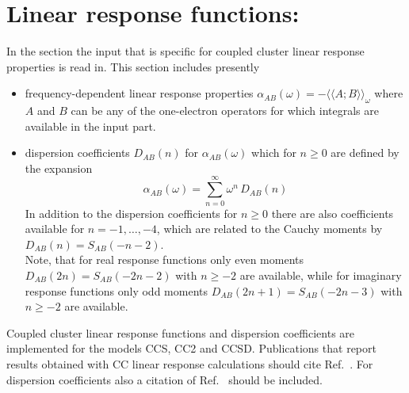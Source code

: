 
\section{Linear response functions: }\label{sec:cclr}

In the  section the input that is
specific for coupled cluster linear response properties is read in. 
This section includes presently 
\begin{itemize}
\item frequency-dependent linear response properties 
      $\alpha_{AB}(\omega)  = - \langle\langle A; B \rangle\rangle_\omega$
      where $A$ and $B$ can be any of the one-electron
      operators for which integrals are available in the 
       input part.
\item dispersion coefficients $D_{AB}(n)$ for $\alpha_{AB}(\omega)$
      which for $n \ge 0$ are defined by the expansion
      $$ \alpha_{AB}(\omega) = \sum_{n=0}^{\infty} \omega^n \, D_{AB}(n) $$
      In addition to the dispersion coefficients for $n \ge 0$
      there are also coefficients available for $ n = -1, \ldots, -4$,
      which are related to the Cauchy moments
       by $ D_{AB}(n) = S_{AB}(-n-2)$.
      \\
      Note, that for real response functions only even moments
      $D_{AB}(2n) = S_{AB}(-2n-2)$ with $n \ge -2$ are available,
      while for imaginary response functions only odd moments
      $D_{AB}(2n+1) = S_{AB}(-2n-3)$ with $n \ge -2$ are available.
\end{itemize}
Coupled cluster linear response functions and dispersion coefficients
are implemented for the models CCS, CC2 and CCSD. 
Publications that report results obtained with CC linear response
calculations should cite Ref.\ \cite{Christiansen:CCLR}. 
For dispersion coefficients also a citation of Ref.\ \cite{Haettig:CAUCHY} 
should be included.

